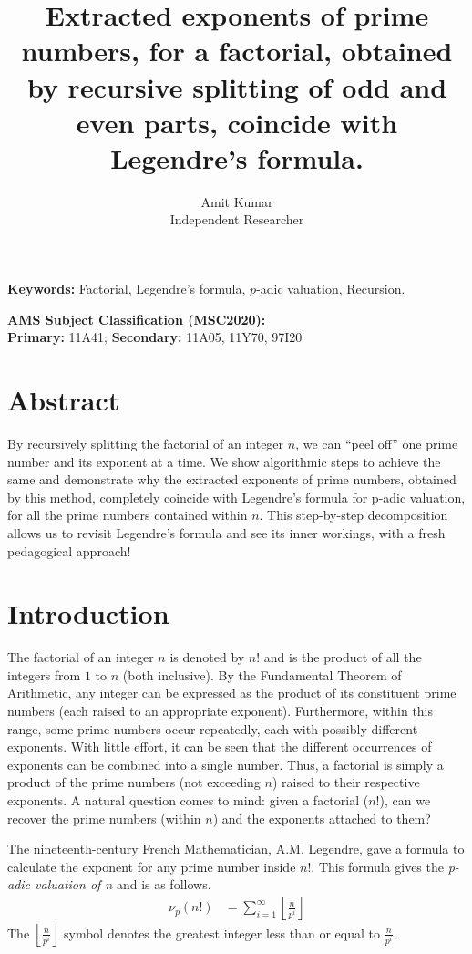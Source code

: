 \documentclass[10 pt,a4paper, article]{amsart}
\title{Extracted exponents of prime numbers, for a factorial, obtained by recursive splitting of odd and even parts, coincide with Legendre's formula.}
\author{Amit Kumar\\Independent Researcher}
\begin{document}
\maketitle

\bigskip
\noindent\textbf{Keywords:} Factorial, Legendre's formula, $p$-adic valuation, Recursion.

\smallskip
\noindent\textbf{AMS Subject Classification (MSC2020):} \\
\textbf{Primary:} 11A41; \textbf{Secondary:} 11A05, 11Y70, 97I20

\bigskip
\section{Abstract}
By recursively splitting the factorial of an integer $n$, we can ``peel off'' one prime number and its exponent at a time. We show algorithmic steps to achieve the same and demonstrate why the extracted exponents of prime numbers, obtained by this method, completely coincide with Legendre's formula for p-adic valuation, for all the prime numbers contained within $n$. This step-by-step decomposition allows us to revisit Legendre's formula and see its inner workings, with a fresh pedagogical approach!

\section{Introduction}
The factorial of an integer $n$ is denoted by $n!$ and is the product of all the integers from $1$ to $n$ (both inclusive). By the Fundamental Theorem of Arithmetic, any integer can be expressed as the product of its constituent prime numbers (each raised to an appropriate exponent). Furthermore, within this range, some prime numbers occur repeatedly, each with possibly different exponents. With little effort, it can be seen that the different occurrences of exponents can be combined into a single number. Thus, a factorial is simply a product of the prime numbers (not exceeding $n$) raised to their respective exponents. A natural question comes to mind: given a factorial ($n!$), can we recover the prime numbers (within $n$) and the exponents attached to them?

The nineteenth-century French Mathematician, A.M. Legendre, gave a formula to calculate the exponent for any prime number inside $n!$. This formula gives the \emph{p-adic valuation of n} and is as follows.
\begin{align*}
\nu_p(n!) &= \sum_{i=1}^{\infty} \left\lfloor \frac{n}{p^i} \right\rfloor
\end{align*}
The $\left\lfloor \frac{n}{p^i} \right\rfloor$ symbol denotes the greatest integer less than or equal to $\frac{n}{p^i}$.
\end{document}
